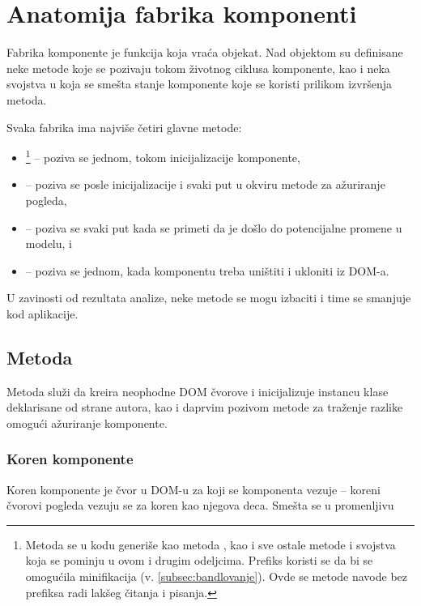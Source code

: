 \section{Anatomija fabrika komponenti}\label{sec:anatomija-fabrika-komponenti}

Fabrika komponente je funkcija koja vraća objekat.
Nad objektom su definisane neke metode koje se pozivaju tokom životnog ciklusa komponente, kao i neka svojstva u koja se smešta stanje komponente koje se koristi prilikom izvršenja metoda.

Svaka fabrika ima najviše četiri glavne metode:

\begin{itemize}
\item {}\footnote{Metoda  se u kodu generiše kao metoda , kao i sve ostale metode i svojstva koja se pominju u ovom i drugim odeljcima. Prefiks  koristi se da bi se omogućila minifikacija (v. \cref{subsec:bandlovanje}). Ovde se metode navode bez prefiksa radi lakšeg čitanja i pisanja.} -- poziva se jednom, tokom inicijalizacije komponente,
\item {} -- poziva se posle inicijalizacije i svaki put u okviru metode za ažuriranje pogleda,
\item {} -- poziva se svaki put kada se primeti da je došlo do potencijalne promene u modelu, i
\item {} -- poziva se jednom, kada komponentu treba uništiti i ukloniti iz DOM-a.
\end{itemize}

U zavinosti od rezultata analize, neke metode se mogu izbaciti i time se smanjuje kod aplikacije.

\subsection{Metoda }

Metoda  služi da kreira neophodne DOM čvorove i inicijalizuje instancu klase deklarisane od strane autora, kao i daprvim pozivom metode za traženje razlike  omogući ažuriranje komponente.

\subsubsection{Koren komponente}
\label{subsubsec:koren-komponente}
\label{subsubsec:init-part-1}

Koren komponente je čvor u DOM-u za koji se komponenta vezuje -- koreni čvorovi pogleda vezuju se za koren kao njegova deca.
Smešta se u promenljivu \code{}

